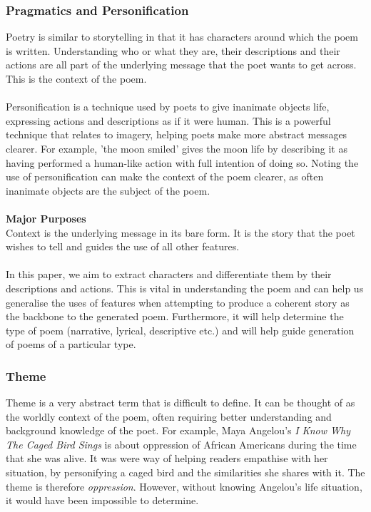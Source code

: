 \subsubsection{Pragmatics and Personification}
Poetry is similar to storytelling in that it has characters around which the poem is written. Understanding who or what they are, their descriptions and their actions are all part of the underlying message that the poet wants to get across. This is the context of the poem.
\\\\
Personification is a technique used by poets to give inanimate objects life, expressing actions and descriptions as if it were human. This is a powerful technique that relates to imagery, helping poets make more abstract messages clearer. For example, 'the moon smiled' gives the moon life by describing it as having performed a human-like action with full intention of doing so. Noting the use of personification can make the context of the poem clearer, as often inanimate objects are the subject of the poem.
\\\\
\textbf{Major Purposes}\\
Context is the underlying message in its bare form. It is the story that the poet wishes to tell and guides the use of all other features.
\\\\
In this paper, we aim to extract characters and differentiate them by their descriptions and actions. This is vital in understanding the poem and can help us generalise the uses of features when attempting to produce a coherent story as the backbone to the generated poem. Furthermore, it will help determine the type of poem (narrative, lyrical, descriptive etc.) and will help guide generation of poems of a particular type. 

\subsubsection{Theme}
Theme is a very abstract term that is difficult to define. It can be thought of as the worldly context of the poem, often requiring better understanding and background knowledge of the poet. For example, Maya Angelou's \textit{I Know Why The Caged Bird Sings} is about oppression of African Americans during the time that she was alive. It was were way of helping readers empathise with her situation, by personifying a caged bird and the similarities she shares with it. The theme is therefore \textit{oppression}. However, without knowing Angelou's life situation, it would have been impossible to determine.


